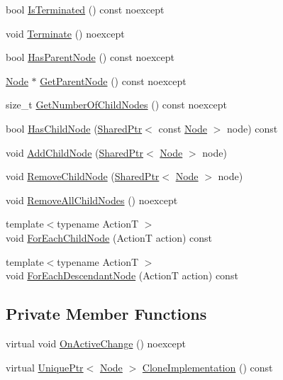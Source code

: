 \begin{DoxyCompactItemize}
\item 
bool \hyperlink{classmage_1_1_node_af669e446591ecb2d56b44769ba432172}{Is\+Terminated} () const noexcept
\item 
void \hyperlink{classmage_1_1_node_aa3dfb60e905aadef7537b1fb5bdc79e6}{Terminate} () noexcept
\item 
bool \hyperlink{classmage_1_1_node_acc47eb0f2eaa60e71fd945e79b4f622d}{Has\+Parent\+Node} () const noexcept
\item 
\hyperlink{classmage_1_1_node}{Node} $\ast$ \hyperlink{classmage_1_1_node_a21ba704ed3af4c80d096ad5f393da8e0}{Get\+Parent\+Node} () const noexcept
\item 
size\+\_\+t \hyperlink{classmage_1_1_node_ab4fff9779c09d873abcf881b6ff85d9e}{Get\+Number\+Of\+Child\+Nodes} () const noexcept
\item 
bool \hyperlink{classmage_1_1_node_a1b8c2d933a281f7f815791db38c965ad}{Has\+Child\+Node} (\hyperlink{namespacemage_a1e01ae66713838a7a67d30e44c67703e}{Shared\+Ptr}$<$ const \hyperlink{classmage_1_1_node}{Node} $>$ node) const
\item 
void \hyperlink{classmage_1_1_node_a11a7c052c5e4a6713d60aaad67dfde5d}{Add\+Child\+Node} (\hyperlink{namespacemage_a1e01ae66713838a7a67d30e44c67703e}{Shared\+Ptr}$<$ \hyperlink{classmage_1_1_node}{Node} $>$ node)
\item 
void \hyperlink{classmage_1_1_node_a0da235c6459c315ad1c4be5c7aa7c7f0}{Remove\+Child\+Node} (\hyperlink{namespacemage_a1e01ae66713838a7a67d30e44c67703e}{Shared\+Ptr}$<$ \hyperlink{classmage_1_1_node}{Node} $>$ node)
\item 
void \hyperlink{classmage_1_1_node_a7627e4e280fc9dd13d255c0f64eba79e}{Remove\+All\+Child\+Nodes} () noexcept
\item 
{\footnotesize template$<$typename ActionT $>$ }\\void \hyperlink{classmage_1_1_node_afedb523a462952ec29aed7504d0a71d4}{For\+Each\+Child\+Node} (ActionT action) const
\item 
{\footnotesize template$<$typename ActionT $>$ }\\void \hyperlink{classmage_1_1_node_a86668c371e1452204b52f2896cbb16fd}{For\+Each\+Descendant\+Node} (ActionT action) const
\end{DoxyCompactItemize}
\subsection*{Private Member Functions}
\begin{DoxyCompactItemize}
\item 
virtual void \hyperlink{classmage_1_1_node_a65c1c55801a8e1d5354ac79d0c2fca6e}{On\+Active\+Change} () noexcept
\item 
virtual \hyperlink{namespacemage_a3316d7143a973e37adf1110f2e80ca31}{Unique\+Ptr}$<$ \hyperlink{classmage_1_1_node}{Node} $>$ \hyperlink{classmage_1_1_node_a71a4763bfd4cba5653488b490e61dc8f}{Clone\+Implementation} () const
\end{DoxyCompactItemize}
